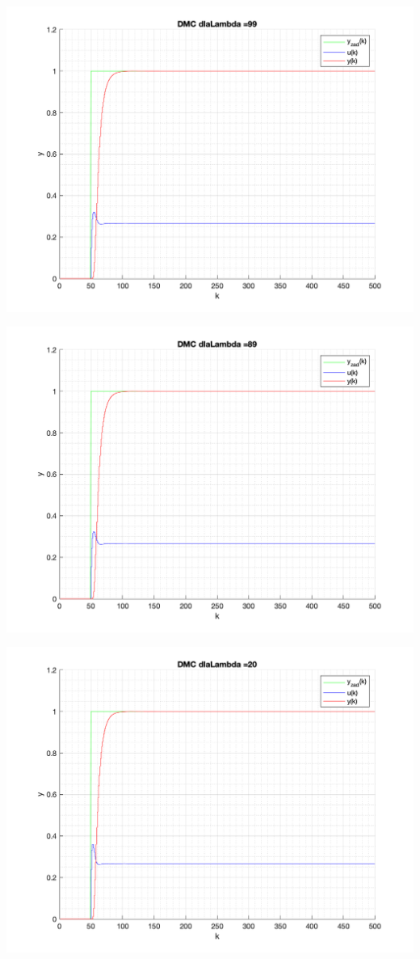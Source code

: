 \documentclass[a4paper, 11pt]{article}
\begin{document}
\begin{enumerate}
 \includegraphics[width=\linewidth]{./ModelsP4_Lambda/P4_DMC_Lambda_99_png.png} 
 
 \includegraphics[width=\linewidth]{./ModelsP4_Lambda/P4_DMC_Lambda_89_png.png} 
 
 \includegraphics[width=\linewidth]{./ModelsP4_Lambda/P4_DMC_Lambda_20_png.png} 
 

\end{enumerate}
\end{document}

